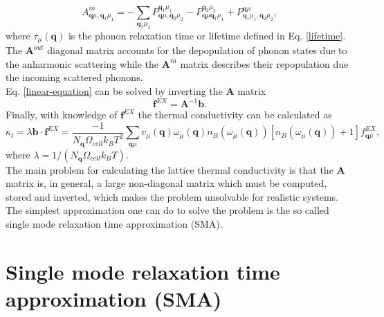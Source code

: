 \begin{equation}
 A_{\mathbf{q}\mu,\mathbf{q}_{1}\mu_{1}}^{in}=-\sum_{\mathbf{q}_{2}\mu_{2}}P_{\mathbf{q}\mu,\mathbf{q}_{2}\mu_{2}}^{\mathbf{q}_{1}\mu_{1}}-P_{\mathbf{q}\mu\mathbf{q}_{1}\mu_{1}}^{\mathbf{q}_{2}\mu_{
 2}}+P_{\mathbf{q}_{1}\mu_{1},\mathbf{q}_{2}\mu_{2}}^{\mathbf{q}\mu},
\end{equation}
where $\tau_{\mu}(\mathbf{q})$ is the phonon relaxation time or lifetime defined in Eq. \ref{lifetime}. The $\mathbf{A}^{out}$ diagonal matrix accounts for the depopulation of phonon 
states due to the anharmonic scattering while the $\mathbf{A}^{in}$ matrix describes their repopulation due the incoming scattered phonons. \\

Eq. \ref{linear-equation} can be solved by inverting the $\mathbf{A}$ matrix
\begin{equation}
\mathbf{f}^{EX}=\mathbf{A}^{-1}\mathbf{b}.
\end{equation}
Finally, with knowledge of $\mathbf{f}^{EX}$ the thermal conductivity can be calculated as
\begin{equation}
 \kappa_{l}=\lambda\mathbf{b}\cdot\mathbf{f}^{EX}=\frac{-1}{N_{\mathbf{q}}\Omega_{cell} k_{B}T^{2}}\sum_{\mathbf{q}\mu}v_{\mu}(\mathbf{q})\omega_{\mu}(\mathbf{q})n_{B}(\omega_{\mu}(\mathbf{q}))[n_{B}(\omega_{\mu}(\mathbf{q}))
 +1]f_{\mathbf{q}\mu}^{EX},
\end{equation}
where $\lambda=1/(N_{\mathbf{q}}\Omega_{cell} k_{B}T)$. \\

The main problem for calculating the lattice thermal conductivity is that the $\mathbf{A}$ matrix is, in general, a large non-diagonal matrix which must be computed, stored and inverted, which makes the problem 
unsolvable for realistic systems. The simplest approximation one can do to solve the problem is the so called single mode relaxation time approximation (SMA).

\section{Single mode relaxation time approximation (SMA)}

